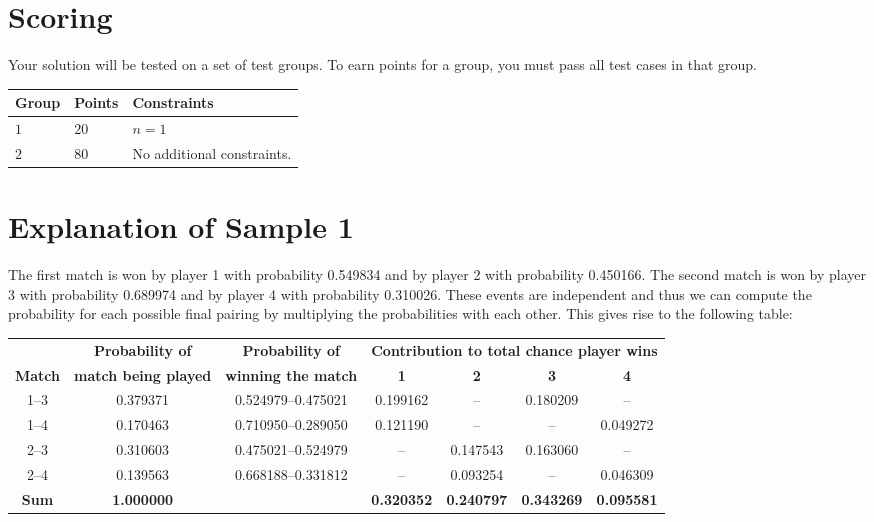 \section*{Scoring}
Your solution will be tested on a set of test groups.
To earn points for a group, you must pass all test cases in that group.

\noindent
\begin{tabular}{| l | l | p{12cm} |}
  \hline
  \textbf{Group} & \textbf{Points} & \textbf{Constraints} \\ \hline
  $1$    & $20$       & $n=1$ \\ \hline
  $2$    & $80$       & No additional constraints. \\ \hline
\end{tabular}

\section*{Explanation of Sample 1}
The first match is won by player 1 with probability 0.549834 and by player 2 with probability 0.450166.
The second match is won by player 3 with probability 0.689974 and by player 4 with probability 0.310026.
These events are independent and thus we can compute the probability
for each possible final pairing by multiplying the probabilities with
each other. This gives rise to the following table:

\begin{tabular}{|c|c|c|c|c|c|c|} \hline
 & {\bf Probability of} & {\bf Probability of} & \multicolumn{4}{|c|}{\bf Contribution to total chance player wins}  \\
{\bf Match} & {\bf match being played} & {\bf winning the match} & {\bf
  1}&{\bf 2}&{\bf 3}&{\bf 4} \\ \hline
1--3 & 0.379371 & 0.524979--0.475021 & 0.199162 & -- & 0.180209 & -- \\
1--4 & 0.170463 & 0.710950--0.289050 & 0.121190 & -- & -- & 0.049272 \\
2--3 & 0.310603 & 0.475021--0.524979 & -- & 0.147543 & 0.163060 & -- \\
2--4 & 0.139563 & 0.668188--0.331812 & -- & 0.093254 & -- & 0.046309 \\ \hline
{\bf Sum }& {\bf 1.000000} &                & {\bf 0.320352} & {\bf 0.240797} & {\bf 0.343269 }& {\bf 0.095581 } \\ \hline
\end{tabular}
